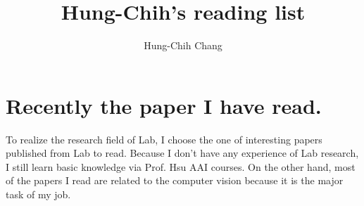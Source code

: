 \documentclass[a4paper]{article}
\title{\textbf{Hung-Chih's reading list}}
\author{Hung-Chih Chang}
\begin{document}
\maketitle

\section{Recently the paper I have read.}
To realize the research field of Lab, I choose the one of interesting papers published from Lab to read. \cite{huang2014building} Because I don't have any experience of Lab research, I still learn basic knowledge via Prof. Hsu AAI courses. On the other hand,  most of the papers I read are related to the computer vision because it is the major task of my job. \cite{tompson2012introduction, Zhang1999, Zhang2000, Li2014}

 

\end{document}

